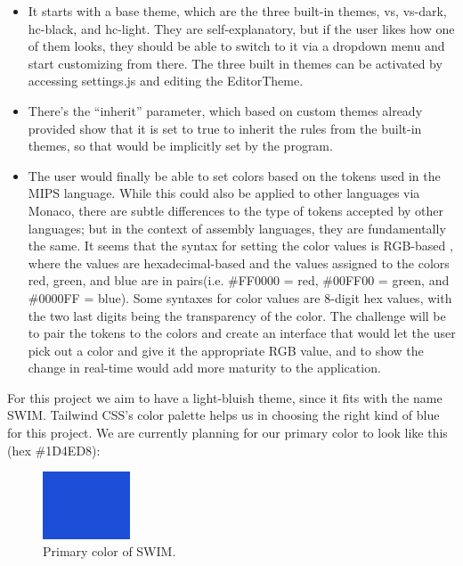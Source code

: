 \documentclass[
    paper=letter,
    parskip=half,
    fontsize=12pt,
    titlepage=firstiscover,
    toc=bibliography,
    numbers=endperiod
]{scrartcl}
\providecommand{\tightlist}{%
  \setlength{\itemsep}{0pt}\setlength{\parskip}{0pt}}
\begin{document}
\begin{itemize}
    \tightlist
    \item It starts with a base theme, which are the three built-in themes, vs,
          vs-dark, hc-black, and hc-light. They are self-explanatory, but if the
          user likes how one of them looks, they should be able to switch to it
          via a dropdown menu and start customizing from there. The three built in
          themes can be activated by accessing settings.js and editing the
          EditorTheme.
    \item There's the ``inherit'' parameter, which based on custom themes already
          provided \cite{monaco-themes} show that it is set to true to inherit the
          rules from the built-in themes, so that would be implicitly set by the
          program.
    \item The user would finally be able to set colors based on the tokens used in
          the MIPS language. While this could also be applied to other languages
          via Monaco, there are subtle differences to the type of tokens accepted
          by other languages; but in the context of assembly languages, they are
          fundamentally the same. It seems that the syntax for setting the color
          values is RGB-based \cite{rapidtables-rgb}, where the values are
          hexadecimal-based and the values assigned to the colors red, green, and
          blue are in pairs(i.e. \#FF0000 = red, \#00FF00 = green, and \#0000FF =
          blue). Some syntaxes for color values are 8-digit hex values, with the
          two last digits being the transparency of the color. The challenge will
          be to pair the tokens to the colors and create an interface that would
          let the user pick out a color and give it the appropriate RGB value, and
          to show the change in real-time would add more maturity to the
          application.
\end{itemize}

For this project we aim to have a light-bluish theme, since it fits with
the name SWIM. Tailwind CSS's color palette helps us in choosing the
right kind of blue for this project. We are currently planning for our
primary color to look like this (hex \#1D4ED8):

\begin{figure}[H]
    \includegraphics[height=2cm]{color-primary}
    \caption{Primary color of SWIM.}
\end{figure}
\end{document}
